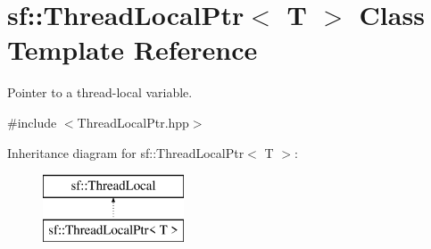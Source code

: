 \hypertarget{classsf_1_1ThreadLocalPtr}{\section{sf\-:\-:Thread\-Local\-Ptr$<$ T $>$ Class Template Reference}
\label{classsf_1_1ThreadLocalPtr}
}


Pointer to a thread-\/local variable.  




{\ttfamily \#include $<$Thread\-Local\-Ptr.\-hpp$>$}

Inheritance diagram for sf\-:\-:Thread\-Local\-Ptr$<$ T $>$\-:\begin{figure}[H]
\begin{center}
\leavevmode
\includegraphics[height=2.000000cm]{classsf_1_1ThreadLocalPtr}
\end{center}
\end{figure}
